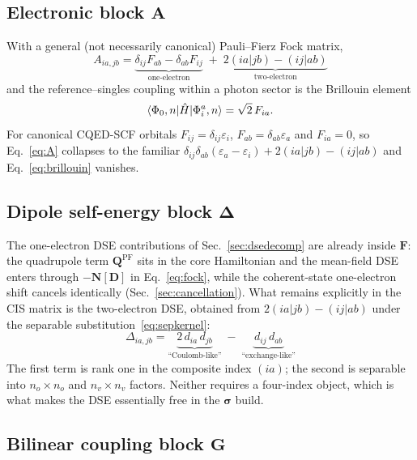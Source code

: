 \documentclass[11pt]{article}
\newcommand{\nocc}{n_{o}}
\newcommand{\nvir}{n_{v}}
\begin{document}
\subsection{Electronic block \texorpdfstring{$\bm{A}$}{A}}

With a general (not necessarily canonical) Pauli--Fierz Fock matrix,
\begin{equation}
\boxed{\;
A_{ia,jb}
= \underbrace{\delta_{ij}F_{ab} - \delta_{ab}F_{ij}}_{\text{one-electron}}
\;+\; \underbrace{2(ia|jb) - (ij|ab)}_{\text{two-electron}}
\;}
\label{eq:A}
\end{equation}
and the reference--singles coupling within a photon sector is the Brillouin
element
\begin{equation}
\braket{\Phi_0, n | \hat{H} | \Phi_i^a, n} = \sqrt{2}\,F_{ia}.
\label{eq:brillouin}
\end{equation}
For canonical CQED-SCF orbitals $F_{ij} = \delta_{ij}\varepsilon_i$,
$F_{ab} = \delta_{ab}\varepsilon_a$ and $F_{ia} = 0$, so Eq.~\eqref{eq:A}
collapses to the familiar
$\delta_{ij}\delta_{ab}(\varepsilon_a - \varepsilon_i) + 2(ia|jb) - (ij|ab)$
and Eq.~\eqref{eq:brillouin} vanishes.

\subsection{Dipole self-energy block \texorpdfstring{$\bm{\Delta}$}{Delta}}
\label{sec:Delta}

The one-electron DSE contributions of Sec.~\ref{sec:dsedecomp} are already
inside $\bm{F}$: the quadrupole term $\bm{Q}^{\mathrm{PF}}$ sits in the core
Hamiltonian and the mean-field DSE enters through $-\bm{N}[\bm{D}]$ in
Eq.~\eqref{eq:fock}, while the coherent-state one-electron shift cancels
identically (Sec.~\ref{sec:cancellation}). What remains explicitly in the CIS
matrix is the two-electron DSE, obtained from
$2(ia|jb) - (ij|ab)$ under the separable substitution~\eqref{eq:sepkernel}:
\begin{equation}
\boxed{\;
\Delta_{ia,jb}
= \underbrace{2\,d_{ia}\,d_{jb}}_{\text{``Coulomb-like''}}
\;-\; \underbrace{d_{ij}\,d_{ab}}_{\text{``exchange-like''}}
\;}
\label{eq:Delta}
\end{equation}
The first term is rank one in the composite index $(ia)$; the second is
separable into $\nocc\times\nocc$ and $\nvir\times\nvir$ factors. Neither
requires a four-index object, which is what makes the DSE essentially free in
the $\bm{\sigma}$ build.

\subsection{Bilinear coupling block \texorpdfstring{$\bm{G}$}{G}}
\label{sec:G}
\end{document}
